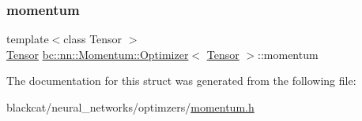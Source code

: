 \subsubsection{\texorpdfstring{momentum}{momentum}}
{\footnotesize\ttfamily template$<$class Tensor $>$ \\
\hyperlink{namespacebc_a659391e47ab612be3ba6c18cf9c89159}{Tensor} \hyperlink{structbc_1_1nn_1_1Momentum_1_1Optimizer}{bc\+::nn\+::\+Momentum\+::\+Optimizer}$<$ \hyperlink{namespacebc_a659391e47ab612be3ba6c18cf9c89159}{Tensor} $>$\+::momentum}



The documentation for this struct was generated from the following file\+:\begin{DoxyCompactItemize}
\item 
blackcat/neural\+\_\+networks/optimzers/\hyperlink{momentum_8h}{momentum.\+h}\end{DoxyCompactItemize}
